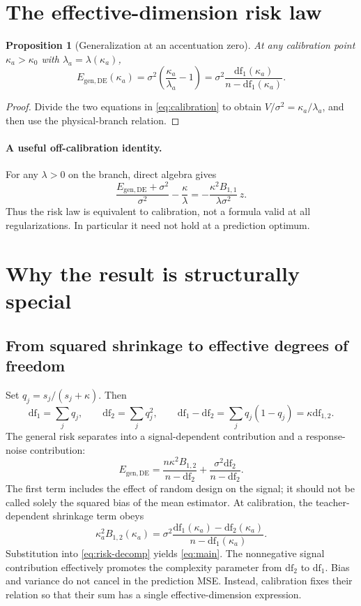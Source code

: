 \documentclass[11pt]{article}
\newtheorem{proposition}{Proposition}
\newcommand{\df}{\mathrm{df}}
\newcommand{\Eg}{E_{\mathrm{gen,DE}}}
\begin{document}
\section{The effective-dimension risk law}
\begin{proposition}[Generalization at an accentuation zero]
At any calibration point $\kappa_a>\kappa_0$ with $\lambda_a=\lambda(\kappa_a)$,
\begin{equation}\label{eq:main}
 \boxed{\quad
 \Eg(\kappa_a)=\sigma^2\left(\frac{\kappa_a}{\lambda_a}-1\right)
 =\sigma^2\frac{\df_1(\kappa_a)}{n-\df_1(\kappa_a)}.
 \quad}
\end{equation}
\end{proposition}
\begin{proof}
Divide the two equations in \eqref{eq:calibration} to obtain
$V/\sigma^2=\kappa_a/\lambda_a$, and then use the physical-branch relation.
\end{proof}

\paragraph{A useful off-calibration identity.}
For any $\lambda>0$ on the branch, direct algebra gives
\[
 \frac{\Eg+\sigma^2}{\sigma^2}-\frac{\kappa}{\lambda}
 =-\frac{\kappa^2B_{1,1}}{\lambda\sigma^2}\,z.
\]
Thus the risk law is equivalent to calibration, not a formula valid at all
regularizations. In particular it need not hold at a prediction optimum.

\section{Why the result is structurally special}
\subsection{From squared shrinkage to effective degrees of freedom}
Set $q_j=s_j/(s_j+\kappa)$. Then
\[
 \df_1=\sum_jq_j,\qquad \df_2=\sum_jq_j^2,\qquad
 \df_1-\df_2=\sum_jq_j(1-q_j)=\kappa\df_{1,2}.
\]
The general risk separates into a signal-dependent contribution and a
response-noise contribution:
\begin{equation}\label{eq:risk-decomp}
 \Eg=\frac{n\kappa^2B_{1,2}}{n-\df_2}
       +\frac{\sigma^2\df_2}{n-\df_2}.
\end{equation}
The first term includes the effect of random design on the signal; it should
not be called solely the squared bias of the mean estimator.
At calibration, the teacher-dependent shrinkage term obeys
\begin{equation}\label{eq:bias}
 \boxed{\kappa_a^2B_{1,2}(\kappa_a)
 =\sigma^2\frac{\df_1(\kappa_a)-\df_2(\kappa_a)}
 {n-\df_1(\kappa_a)}.}
\end{equation}
Substitution into \eqref{eq:risk-decomp} yields \eqref{eq:main}.
The nonnegative signal contribution effectively promotes the complexity
parameter from $\df_2$ to $\df_1$. Bias and variance do not cancel in the
prediction MSE. Instead, calibration fixes their relation so that their sum
has a single effective-dimension expression.
\end{document}
